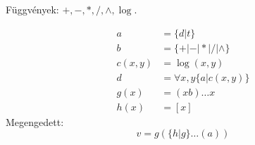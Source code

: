 \documentclass[]{article}
\begin{document}
	Függvények: $+,-,*,/,\wedge,\log$.
	
	\begin{align*}
		a&=\{d|t\}\\
		b&=\{+|-|*|/|\wedge\}\\
		c(x,y)&=\log(x,y)\\
		d&=\forall x,y\{a|c(x,y)\}\\
		g(x)&=(xb)\ldots x\\
		h(x)&=[x]
	\end{align*}
	Megengedett:
	\begin{equation*}
		v=g(\{h|g\}\ldots({a}))
	\end{equation*}
\end{document}
